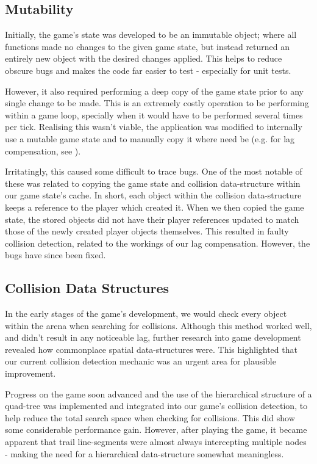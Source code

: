 \documentclass{standalone}
\begin{document}
		\subsection{Mutability}
			Initially, the game's state was developed to be an immutable object; where all functions made no changes to the given game state, but instead returned an entirely new object with the desired changes applied. This helps to reduce obscure bugs and makes the code far easier to test - especially for unit tests.

			However, it also required performing a deep copy of the game state prior to any single change to be made. This is an extremely costly operation to be performing within a game loop, specially when it would have to be performed several times per tick. Realising this wasn't viable, the application was modified to internally use a mutable game state and to manually copy it where need be (e.g. for lag compensation, see ).

			Irritatingly, this caused some difficult to trace bugs. One of the most notable of these was related to copying the game state and collision data-structure within our game state's cache. In short, each object within the collision data-structure keeps a reference to the player which created it. When we then copied the game state, the stored objects did not have their player references updated to match those of the newly created player objects themselves. This resulted in faulty collision detection, related to the workings of our lag compensation. However, the bugs have since been fixed.

		\subsection{Collision Data Structures}
			In the early stages of the game's development, we would check every object within the arena when searching for collisions. Although this method worked well, and didn't result in any noticeable lag, further research into game development revealed how commonplace spatial data-structures were. This highlighted that our current collision detection mechanic was an urgent area for plausible improvement.

			Progress on the game soon advanced and the use of the hierarchical structure of a quad-tree was implemented and integrated into our game's collision detection, to help reduce the total search space when checking for collisions. This did show some considerable performance gain. However, after playing the game, it became apparent that trail line-segments were almost always intercepting multiple nodes - making the need for a hierarchical data-structure somewhat meaningless.
\end{document}
